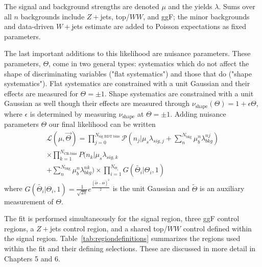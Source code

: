 The signal and background strengths are denoted $\mu$ and the yields $\lambda$. Sums over all $n$ backgrounds include $Z+$jets, top/$WW$, and ggF; the minor backgrounds and data-driven $W+$jets estimate are added to Poisson expectations as fixed parameters. 

The last important additions to this likelihood are nuisance parameters. These parameters, $\Theta$, come in two general types: systematics which do not affect the shape of discriminating variables ("flat systematics") and those that do ("shape systematics"). Flat systematics are constrained with a unit Gaussian and their effects are measured for $\Theta=\pm1$. Shape systematics are constrained with a unit Gaussian as well though their effects are measured through $\nu_{\text{shape}}(\Theta)= 1+\epsilon\Theta$, where $\epsilon$ is determined by measuring $\nu_{\text{shape}}$ at $\Theta=\pm 1$. Adding nuisance parameters $\Theta$ our final likelihood can be written 
\begin{equation}
  \begin{aligned}
\mathcal{L}(\mu,\vec{\Theta}) = \displaystyle\prod_{j=0}^{N_{\text{sig BDT bins}}} \mathcal{P} (n_{j}|\mu_s \lambda_{sig,j} + \displaystyle\sum_{n}^{N_{\text{bkg}}}\mu_b^{n} \lambda_{bkg}^{nj}) \\
\times \displaystyle\prod_{k=1}^{N_{\text{CR-bins}}} P(n_{k}|\mu_s \lambda_{sig,k}\\ + \displaystyle\sum_{n}^{N_{\text{bkg}}}\mu_b^{n} \lambda_{bkg}^{nk}) \times \displaystyle\prod_{i=1}^{N_{\Theta_i}}G(\tilde{\Theta_i}|\Theta_i,1)
  \end{aligned}
\end{equation}
where $G(\tilde{\Theta_i}|\Theta_i,1) = \frac{1}{\sqrt{2\pi}}e^{\frac{(\tilde{\Theta}-\Theta)^2}{2}}$ is the unit Gaussian and $\tilde{\Theta}$ is an auxiliary measurement of $\Theta$.

The fit is performed simultaneously for the signal region, three ggF control regions, a $Z+$jets control region, and a shared top/$WW$ control defined within the signal region. Table~\ref{tab:regiondefinitions} summarizes the regions used within the fit and their defining selections. These are discussed in more detail in Chapters 5 and 6. 

